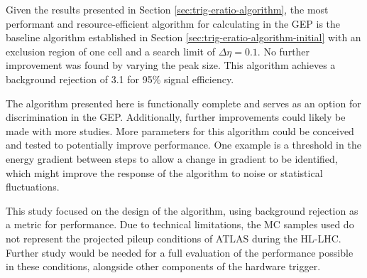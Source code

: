 
Given the results presented in Section
\ref{sec:trig-eratio-algorithm}, the
most performant and resource-efficient algorithm for calculating \eratio in the
\ac{GEP} is the baseline algorithm established in Section
\ref{sec:trig-eratio-algorithm-initial} with an exclusion region of one cell and
a search limit of $\Delta\eta=0.1$. No further improvement was found by varying
the peak size. This algorithm achieves a background rejection of 3.1 for 95\%
signal efficiency.


The \eratio algorithm presented here is functionally complete and serves as an
option for \egamma discrimination in the \ac{GEP}. Additionally, further improvements
could likely be made with more studies.
More parameters for this \eratio algorithm could be conceived and tested to
potentially improve performance.
One example is a threshold in the energy gradient between steps to allow a
change in gradient to be identified, which might improve the response of the
algorithm to noise or statistical fluctuations.

This study focused on the design of the \eratio algorithm, using background
rejection as a metric for performance. Due to technical limitations, the \ac{MC}
samples used do not represent the projected pileup conditions of \ac{ATLAS}
during the \ac{HL-LHC}.  Further study would be needed for a full evaluation of
the performance possible in these conditions, alongside other components of the
hardware trigger.

